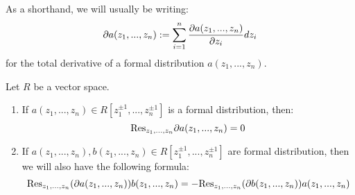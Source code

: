         \begin{convention}
            As a shorthand, we will usually be writing:
                $$\partial a(z_1, ..., z_n) := \sum_{i = 1}^n \frac{\partial a(z_1, ..., z_n)}{\partial z_i} dz_i$$
            for the total derivative of a formal distribution $a(z_1, ..., z_n)$.
        \end{convention}
        \begin{lemma} \label{lemma: holomorphic_formal_distributions_and_integration_by_parts}
            Let $R$ be a vector space.
            \begin{enumerate}
                \item If $a(z_1, ..., z_n) \in R[z_1^{\pm 1}, ..., z_n^{\pm 1}]$ is a formal distribution, then:
                    $$\mathrm{Res}_{z_1, ..., z_n} \partial a(z_1, ..., z_n) = 0$$
                \item If $a(z_1, ..., z_n), b(z_1, ..., z_n) \in R[z_1^{\pm 1}, ..., z_n^{\pm 1}]$ are formal distribution, then we will also have the following  formula:
                    $$\mathrm{Res}_{z_1, ..., z_n} (\partial a(z_1, ..., z_n)) b(z_1, ..., z_n) = -\mathrm{Res}_{z_1, ..., z_n} (\partial b(z_1, ..., z_n)) a(z_1, ..., z_n)$$
            \end{enumerate}
        \end{lemma}

